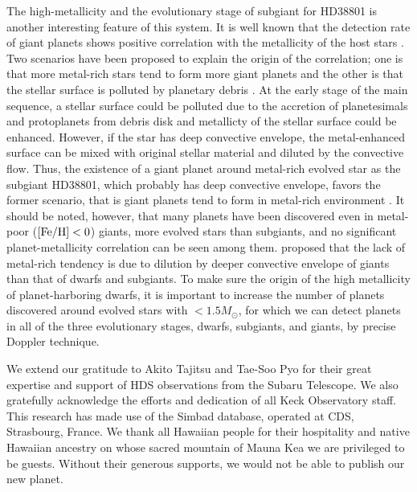 \documentclass[manuscript]{aastex}
\begin{document}
The high-metallicity and the evolutionary stage of subgiant for HD38801 is another interesting feature of this system.
It is well known that the detection rate of giant planets shows positive correlation with the metallicity of the host stars \citep{2005ApJ...622.1102F}.
Two scenarios have been proposed to explain the origin of the correlation; one is that more metal-rich stars tend to form more giant planets and the other is that the stellar surface is polluted by planetary debris \citep[e.g.,][]{2004ApJ...616..567I}.
At the early stage of the main sequence, a stellar surface could be polluted due to the accretion of planetesimals and protoplanets from debris disk and metallicty of the stellar surface could be enhanced.
However, if the star has deep convective envelope, the metal-enhanced surface can be mixed with original stellar material and diluted by the convective flow.
Thus, the existence of a giant planet around metal-rich evolved star as the subgiant HD38801, which 
probably has deep convective envelope, favors the former scenario, that is giant planets tend 
to form in metal-rich environment \citep{2005ApJ...622.1102F}.
It should be noted, however, that many planets have been discovered even in metal-poor (${\rm [Fe/H]}<0$) giants, more evolved stars than subgiants, and no significant planet-metallicity correlation can be seen among them.
\cite{2007A&A...473..979P} proposed that the lack of metal-rich tendency is due to dilution by 
deeper convective envelope of giants than that of dwarfs and subgiants.
To make sure the origin of the high metallicity of planet-harboring dwarfs, it is important to increase the number of planets discovered around evolved stars with $<1.5M_{\odot}$, for which we can detect planets in all of the three evolutionary stages, dwarfs, subgiants, and giants, by precise Doppler technique.


We extend our gratitude to Akito Tajitsu and Tae-Soo Pyo for their great expertise and support 
of HDS observations from the Subaru Telescope.
We also gratefully acknowledge the efforts and dedication of all Keck Observatory staff.
This research has made use of the Simbad database, operated at CDS, Strasbourg, France.
We thank all Hawaiian people for their hospitality and native Hawaiian ancestry on whose 
sacred mountain of Mauna Kea we are privileged to be guests.
Without their generous supports, we would not be able to publish our new planet.

\clearpage
\end{document}
